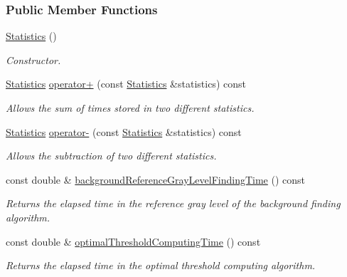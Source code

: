 \subsubsection*{Public Member Functions}
\begin{CompactItemize}
\item 
\hyperlink{class_statistics_60ddd90a571ed4c3ce8c0f6317a36d63}{Statistics} ()
\begin{CompactList}\small\item\em Constructor. \item\end{CompactList}\item 
\hyperlink{class_statistics}{Statistics} \hyperlink{class_statistics_cb07c98a63e07fdb1476ffb282b84676}{operator+} (const \hyperlink{class_statistics}{Statistics} \&statistics) const 
\begin{CompactList}\small\item\em Allows the sum of times stored in two different statistics. \item\end{CompactList}\item 
\hyperlink{class_statistics}{Statistics} \hyperlink{class_statistics_529bed34d909d88440214d6983779043}{operator-} (const \hyperlink{class_statistics}{Statistics} \&statistics) const 
\begin{CompactList}\small\item\em Allows the subtraction of two different statistics. \item\end{CompactList}\item 
const double \& \hyperlink{class_statistics_d70a464a72d94c795097608e2a18550a}{backgroundReferenceGrayLevelFindingTime} () const 
\begin{CompactList}\small\item\em Returns the elapsed time in the reference gray level of the background finding algorithm. \item\end{CompactList}\item 
const double \& \hyperlink{class_statistics_87bdb5b4f7a88cb74d0072fd0c7a2248}{optimalThresholdComputingTime} () const 
\begin{CompactList}\small\item\em Returns the elapsed time in the optimal threshold computing algorithm. \item\end{CompactList}\item 

\end{CompactItemize}
